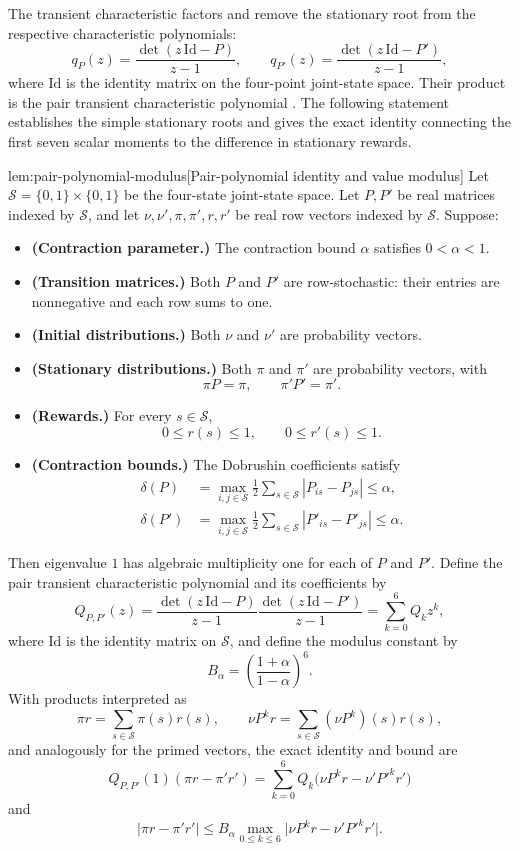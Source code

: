 \documentclass[11pt]{article}
\begin{document}
The transient characteristic factors  and  remove the stationary root from the respective characteristic polynomials:
\[
q_P(z)=\frac{\det(z\,\mathrm{Id}-P)}{z-1},
\qquad
q_{P'}(z)=\frac{\det(z\,\mathrm{Id}-P')}{z-1},
\]
where \(\mathrm{Id}\) is the identity matrix on the four-point joint-state space. Their product is the pair transient characteristic polynomial . The following statement establishes the simple stationary roots and gives the exact identity connecting the first seven scalar moments to the difference in stationary rewards.

\begin{lemmav}{lem:pair-polynomial-modulus}[Pair-polynomial identity and value modulus]
Let \(\mathcal S=\{0,1\}\times\{0,1\}\) be the four-state joint-state space. Let \(P,P'\) be real matrices indexed by \(\mathcal S\), and let \(\nu,\nu',\pi,\pi',r,r'\) be real row vectors indexed by \(\mathcal S\). Suppose:
\begin{itemize}
\item \textbf{(Contraction parameter.)} The contraction bound \(\alpha\) satisfies \(0<\alpha<1\).
\item \textbf{(Transition matrices.)} Both \(P\) and \(P'\) are row-stochastic: their entries are nonnegative and each row sums to one.
\item \textbf{(Initial distributions.)} Both \(\nu\) and \(\nu'\) are probability vectors.
\item \textbf{(Stationary distributions.)} Both \(\pi\) and \(\pi'\) are probability vectors, with
\[
\pi P=\pi,\qquad \pi'P'=\pi'.
\]
\item \textbf{(Rewards.)} For every \(s\in\mathcal S\),
\[
0\le r(s)\le1,\qquad 0\le r'(s)\le1.
\]
\item \textbf{(Contraction bounds.)} The Dobrushin coefficients satisfy
\[
\begin{aligned}
\delta(P)&=\max_{i,j\in\mathcal S}\frac12
 \sum_{s\in\mathcal S}|P_{is}-P_{js}|\le\alpha,\\
\delta(P')&=\max_{i,j\in\mathcal S}\frac12
 \sum_{s\in\mathcal S}|P'_{is}-P'_{js}|\le\alpha.
\end{aligned}
\]
\end{itemize}
Then eigenvalue \(1\) has algebraic multiplicity one for each of \(P\) and \(P'\). Define the pair transient characteristic polynomial and its coefficients by
\[
Q_{P,P'}(z)
=\frac{\det(z\,\mathrm{Id}-P)}{z-1}
 \frac{\det(z\,\mathrm{Id}-P')}{z-1}
=\sum_{k=0}^{6}Q_k z^k,
\]
where \(\mathrm{Id}\) is the identity matrix on \(\mathcal S\), and define the modulus constant by
\[
B_\alpha=\left(\frac{1+\alpha}{1-\alpha}\right)^6.
\]
With products interpreted as
\[
\pi r=\sum_{s\in\mathcal S}\pi(s)r(s),
\qquad
\nu P^k r=\sum_{s\in\mathcal S}(\nu P^k)(s)r(s),
\]
and analogously for the primed vectors, the exact identity and bound are
\[
Q_{P,P'}(1)(\pi r-\pi'r')
=\sum_{k=0}^{6}Q_k\bigl(\nu P^k r-\nu'P'^k r'\bigr)
\]
and
\[
|\pi r-\pi'r'|
\le B_\alpha
 \max_{0\le k\le6}\bigl|\nu P^k r-\nu'P'^k r'\bigr|.
\]
\end{lemmav}
\end{document}
